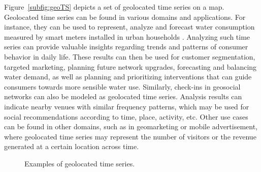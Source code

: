 Figure~\ref{subfig:geoTS} depicts a set of geolocated time series on a map. Geolocated time series can be found in various domains and applications. For instance, they can be used to represent, analyze and forecast water consumption measured by smart meters installed in urban households \cite{DBLP:conf/edbt/ChronisGA16}. Analyzing such time series can provide valuable insights regarding trends and patterns of consumer behavior in daily life. These results can then be used for customer segmentation, targeted marketing, planning future network upgrades, forecasting and balancing water demand, as well as planning and prioritizing interventions that can guide consumers towards more sensible water use. Similarly, check-ins in geosocial networks can also be modeled as geolocated time series. Analysis results can indicate nearby venues with similar frequency patterns, which may be used for social recommendations according to time, place, activity, etc. Other use cases can be found in other domains, such as in geomarketing or mobile advertisement, where geolocated time series may represent the number of visitors or the revenue generated at a certain location across time.

\begin{figure}[!tb]
 \centering
  \quad
\caption{Examples of geolocated time series.}
\label{fig:geoTS_examples}
\end{figure}

